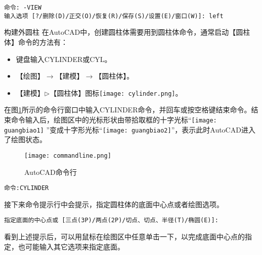 \begin{procedure}
\begin{lstlisting}
命令: -VIEW
输入选项 [?/删除(D)/正交(O)/恢复(R)/保存(S)/设置(E)/窗口(W)]: left
\end{lstlisting}


\item 构建外圆柱
在AutoCAD中，创建圆柱体需要用到圆柱体命令，通常启动【圆柱体】命令的方法有：
\begin{itemize}
\item 键盘输入CYLINDER或CYL。
\item 【绘图】$\rightarrow$【建模】$\rightarrow$【圆柱体】。
\item 【建模】$\triangleright$【圆柱体】图标\texttt{[image: cylinder.png]}。
\end{itemize}
在图\ref{fig:commandline}所示的命令行窗口中输入CYLINDER命令，并回车或按空格键结束命令。结束命令输入后，绘图区中的光标形状由带拾取框的十字光标“\texttt{[image: guangbiao1]} ”变成十字形光标“\texttt{[image: guangbiao2]}”，表示此时AutoCAD进入了绘图状态。
\begin{figure}[htbp]
\centering
\texttt{[image: commandline.png]}
\caption{AutoCAD命令行}\label{fig:commandline}
\end{figure}

\begin{lstlisting}
命令:CYLINDER
\end{lstlisting}
接下来命令提示行中会提示，指定圆柱体的底面中心点或者绘图选项。
\begin{lstlisting}
指定底面的中心点或 [三点(3P)/两点(2P)/切点、切点、半径(T)/椭圆(E)]:
\end{lstlisting}
看到上述提示后，可以用鼠标在绘图区中任意单击一下，以完成底面中心点的指定，也可能输入其它选项来指定底面。


\end{procedure}
